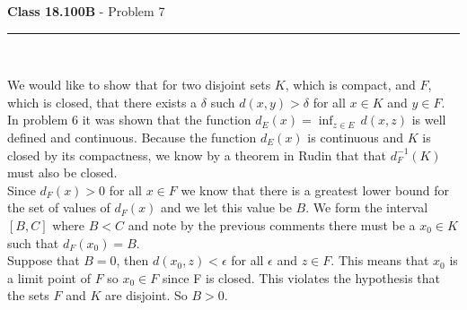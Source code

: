\documentclass[11pt,reqno]{article}
\begin{document}
\vspace{15pt}
\begin{flushleft} 
\textbf{Class 18.100B} - Problem 7\\
\rule{500pt}{1pt}\\
\end{flushleft} 

We would like to show that for two disjoint sets $K$, which is compact, and $F$, which is closed, that there exists a $\delta$ such $d(x,y) > \delta$ for all $x \in K$ and $y \in F$.\\
\indent In problem 6 it was shown that the function $d_E(x) = \inf_{z \in E} \, d(x,z)$ is well defined and continuous. Because the function $d_E(x)$ is continuous and $K$ is closed by its compactness, we know by a theorem in Rudin that that $d^{-1}_F(K)$ must also be closed. \\
\indent Since $d_F(x) > 0$ for all $x \in F$ we know that there is a greatest lower bound for the set of values of $d_F(x)$ and we let this value be $B$. We form the interval $[B,C]$ where $B < C$ and note by the previous comments there must be a $x_0 \in K$ such that $d_F(x_0) = B$. \\
\indent Suppose that $B = 0$, then $d(x_0,z) < \epsilon$ for all $\epsilon$ and $z \in F$. This means that $x_0$ is a limit point of $F$ so $x_0 \in F$ since F is closed. This violates the hypothesis that the sets $F$ and $K$ are disjoint. So $B > 0$.



\end{document}
